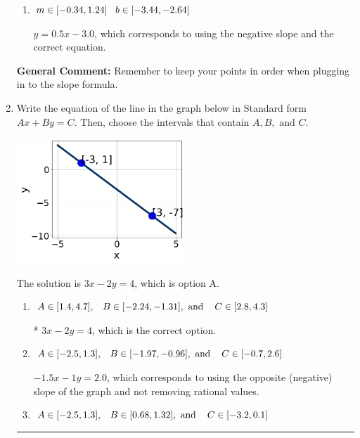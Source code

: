 \documentclass{extbook}[14pt]
\newcommand{\litem}[1]{\item #1

\rule{\textwidth}{0.4pt}}
\begin{document}
\begin{enumerate}
{\begin{enumerate}[label=\Alph*.]
 $y = -0.5x -8$, which corresponds to using the correct slope/equation but not distributing correctly using the second point.
\item \( m \in [-0.34, 1.24] \hspace*{3mm} b \in [-3.44, -2.64] \)

 $y = 0.5x -3.0$, which corresponds to using the negative slope and the correct equation.
\end{enumerate}

\textbf{General Comment:} Remember to keep your points in order when plugging in to the slope formula.
}
\litem{
Write the equation of the line in the graph below in Standard form $Ax+By=C$. Then, choose the intervals that contain $A, B, \text{ and } C$.

\begin{center}
    \includegraphics[width=0.5\textwidth]{../Figures/linearGraphToStandardB.png}
\end{center}


The solution is \( 3x - 2y = 4 \), which is option A.\begin{enumerate}[label=\Alph*.]
\item \( A \in [1.4, 4.7], \hspace{3mm} B \in [-2.24, -1.31], \text{ and } \hspace{3mm} C \in [2.8, 4.3] \)

* $3x - 2y = 4$, which is the correct option.
\item \( A \in [-2.5, 1.3], \hspace{3mm} B \in [-1.97, -0.96], \text{ and } \hspace{3mm} C \in [-0.7, 2.6] \)

 $-1.5x - 1y = 2.0$, which corresponds to using the opposite (negative) slope of the graph and not removing rational values.
\item \( A \in [-2.5, 1.3], \hspace{3mm} B \in [0.68, 1.32], \text{ and } \hspace{3mm} C \in [-3.2, 0.1] \)


\end{enumerate}}
\end{enumerate}
\end{document}
